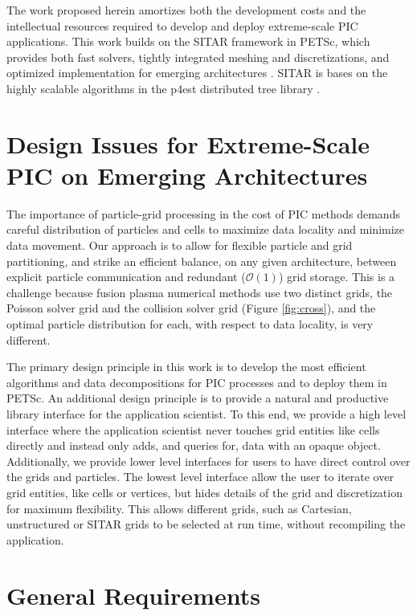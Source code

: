 \documentclass[review]{siamart}
\newcommand{\Order}[1]{\ensuremath{\mathcal{O}(#1)}}    %
\begin{document}
The work proposed herein amortizes both the development costs and the intellectual resources required to develop and deploy extreme-scale PIC applications.
This work builds on the SITAR framework in PETSc, which provides both fast solvers, tightly integrated meshing and discretizations, and optimized implementation for emerging architectures \cite{KnepleyBrownMcInnesSmithRuppAdams2015}.
SITAR is bases on the highly scalable algorithms in the p4est distributed tree library \cite{DBLP:journals/siamsc/IsaacBWG15,Rudi:2015:EIS:2807591.2807675,Stadler1033}.

\section{Design Issues for Extreme-Scale PIC on Emerging Architectures}

The importance of particle-grid processing in the cost of PIC methods demands careful distribution of particles and cells to maximize data locality and minimize data movement.
Our approach is to allow for flexible particle and grid partitioning, and strike an efficient balance, on any given architecture, between explicit particle communication and redundant (\Order{1}) grid storage.
This is a challenge because fusion plasma numerical methods use two distinct grids, the Poisson solver grid and the collision solver grid (Figure \ref{fig:cross}), and the optimal particle distribution for each, with respect to data locality, is very different.

The primary design principle in this work is to develop the most efficient algorithms and data decompositions for PIC processes and to deploy them in PETSc.
An additional design principle is to provide a natural and productive library interface for the application scientist.
To this end, we provide a high level interface where the application scientist never touches grid entities like cells directly and instead only adds, and queries for, data with an opaque object.
Additionally, we provide lower level interfaces for users to have direct control over the grids and particles.
The lowest level interface allow the user to iterate over grid entities, like cells or vertices, but hides details of the grid and discretization for maximum flexibility.
This allows different grids, such as Cartesian, unstructured or SITAR grids to be selected at run time, without recompiling the application.

\section{General Requirements}
\end{document}
